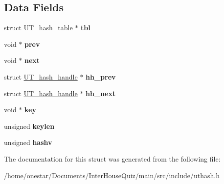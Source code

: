 \subsection*{Data Fields}
\begin{DoxyCompactItemize}
\item 
\hypertarget{struct_u_t__hash__handle_af0deeb3fe5f35a4c85d105090b498c8d}{struct \hyperlink{struct_u_t__hash__table}{U\+T\+\_\+hash\+\_\+table} $\ast$ {\bfseries tbl}}\label{struct_u_t__hash__handle_af0deeb3fe5f35a4c85d105090b498c8d}

\item 
\hypertarget{struct_u_t__hash__handle_af714e69444763fb9a76ec901a014baf1}{void $\ast$ {\bfseries prev}}\label{struct_u_t__hash__handle_af714e69444763fb9a76ec901a014baf1}

\item 
\hypertarget{struct_u_t__hash__handle_a75b19ffcca77bfc647ff02695958fd95}{void $\ast$ {\bfseries next}}\label{struct_u_t__hash__handle_a75b19ffcca77bfc647ff02695958fd95}

\item 
\hypertarget{struct_u_t__hash__handle_a079301c7093356547fb4601a85503c01}{struct \hyperlink{struct_u_t__hash__handle}{U\+T\+\_\+hash\+\_\+handle} $\ast$ {\bfseries hh\+\_\+prev}}\label{struct_u_t__hash__handle_a079301c7093356547fb4601a85503c01}

\item 
\hypertarget{struct_u_t__hash__handle_a42ef2993dcaaebd656c4a40d174e0c78}{struct \hyperlink{struct_u_t__hash__handle}{U\+T\+\_\+hash\+\_\+handle} $\ast$ {\bfseries hh\+\_\+next}}\label{struct_u_t__hash__handle_a42ef2993dcaaebd656c4a40d174e0c78}

\item 
\hypertarget{struct_u_t__hash__handle_ab5c000aec752f2206131e183daf5efbf}{void $\ast$ {\bfseries key}}\label{struct_u_t__hash__handle_ab5c000aec752f2206131e183daf5efbf}

\item 
\hypertarget{struct_u_t__hash__handle_a4563ea2b1ae1597aa9fd62e005d447b4}{unsigned {\bfseries keylen}}\label{struct_u_t__hash__handle_a4563ea2b1ae1597aa9fd62e005d447b4}

\item 
\hypertarget{struct_u_t__hash__handle_ae73531e09ac884600d96a71ad9afbfa4}{unsigned {\bfseries hashv}}\label{struct_u_t__hash__handle_ae73531e09ac884600d96a71ad9afbfa4}

\end{DoxyCompactItemize}


The documentation for this struct was generated from the following file\+:\begin{DoxyCompactItemize}
\item 
/home/onestar/\+Documents/\+Inter\+House\+Quiz/main/src/include/uthash.\+h\end{DoxyCompactItemize}
